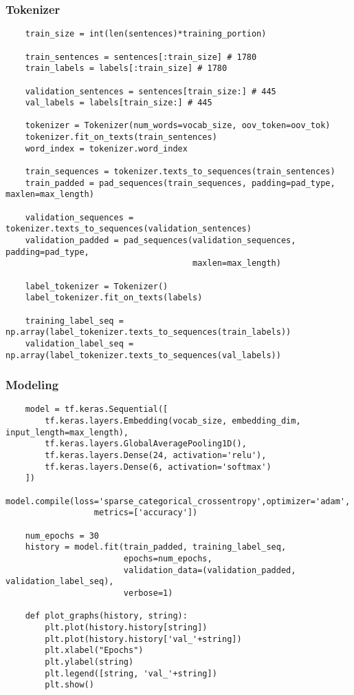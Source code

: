 \documentclass[11pt, a4paper]{article}
\begin{document}
\begin{spacing}{1.1}
	\subsubsection{Tokenizer}
	\begin{lstlisting}
	train_size = int(len(sentences)*training_portion)
	
	train_sentences = sentences[:train_size] # 1780
	train_labels = labels[:train_size] # 1780
	
	validation_sentences = sentences[train_size:] # 445
	val_labels = labels[train_size:] # 445
	
	tokenizer = Tokenizer(num_words=vocab_size, oov_token=oov_tok)
	tokenizer.fit_on_texts(train_sentences)
	word_index = tokenizer.word_index
	
	train_sequences = tokenizer.texts_to_sequences(train_sentences)
	train_padded = pad_sequences(train_sequences, padding=pad_type, maxlen=max_length)
	
	validation_sequences = tokenizer.texts_to_sequences(validation_sentences)
	validation_padded = pad_sequences(validation_sequences, padding=pad_type, 
	                                  maxlen=max_length)
	
	label_tokenizer = Tokenizer()
	label_tokenizer.fit_on_texts(labels)
	
	training_label_seq = np.array(label_tokenizer.texts_to_sequences(train_labels))
	validation_label_seq = np.array(label_tokenizer.texts_to_sequences(val_labels))                                  
	\end{lstlisting} \newpage

	\subsubsection{Modeling}
	\begin{lstlisting}
	model = tf.keras.Sequential([
		tf.keras.layers.Embedding(vocab_size, embedding_dim, input_length=max_length),
		tf.keras.layers.GlobalAveragePooling1D(),
		tf.keras.layers.Dense(24, activation='relu'),
		tf.keras.layers.Dense(6, activation='softmax')
	])
	model.compile(loss='sparse_categorical_crossentropy',optimizer='adam',
	              metrics=['accuracy'])
	
	num_epochs = 30
	history = model.fit(train_padded, training_label_seq, 
	                    epochs=num_epochs, 
	                    validation_data=(validation_padded, validation_label_seq), 
	                    verbose=1)
	
	def plot_graphs(history, string):
		plt.plot(history.history[string])
		plt.plot(history.history['val_'+string])
		plt.xlabel("Epochs")
		plt.ylabel(string)
		plt.legend([string, 'val_'+string])
		plt.show()
	

\end{lstlisting}
\end{spacing}
\end{document}
